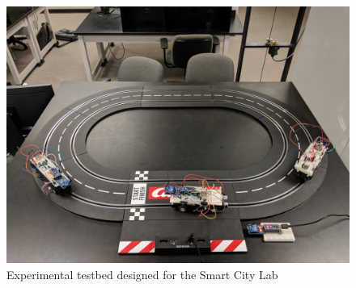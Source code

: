 \documentclass[12pt]{article}
\begin{document}
\begin{figure}[H]
    \includegraphics[scale=0.4]{testbed}
    \centering
    \caption{Experimental testbed designed for the Smart City Lab}
    \label{fig:testbed}
\end{figure}



%
%
\end{document}
